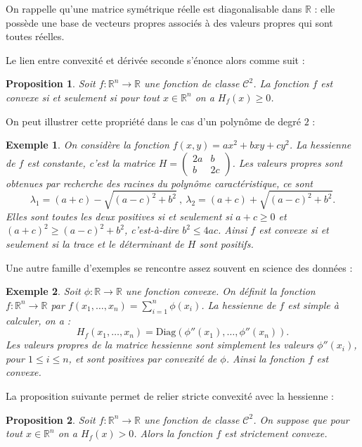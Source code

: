 \documentclass[a4paper]{book}
\newtheorem{proposition}{Proposition}
\newtheorem{exemple}{Exemple}
\newcommand{\Rr}{\mathbb{R}}
\begin{document}
On rappelle qu'une matrice symétrique réelle est diagonalisable dans $\Rr$ : elle possède une base de vecteurs propres associés à des valeurs propres qui sont toutes réelles.

\bigskip

Le lien entre convexité et dérivée seconde s'énonce alors comme suit : 
\begin{proposition}
Soit $f : \Rr^n \to \Rr$ une fonction de classe $\mathcal{C}^2$. La fonction $f$ est convexe si et seulement si pour tout $x \in \Rr^n$ on a $H_f(x) \ge 0$.
\end{proposition}

On peut illustrer cette propriété dans le cas d'un polynôme de degré $2$ : 

\begin{exemple}
On considère la fonction $f(x,y) = a x^2 + b xy + c y^2$. La hessienne de $f$ est constante, c'est la matrice $H = \begin{pmatrix} 2a & b \\ b & 2c \end{pmatrix}$. Les valeurs propres sont obtenues par recherche des racines du polynôme caractéristique, ce sont $$\lambda_1 = (a+c) - \sqrt{(a-c)^2+b^2} \ , \ \lambda_2 = (a+c) + \sqrt{(a-c)^2+b^2}.$$ Elles sont toutes les deux positives si et seulement si $a+c \ge 0$ et $(a+c)^2 \ge (a-c)^2+b^2$, c'est-à-dire $b^2 \le 4 ac$. Ainsi $f$ est convexe si et seulement si la trace et le déterminant de $H$ sont positifs.
\end{exemple}

Une autre famille d'exemples se rencontre assez souvent en science des données : 

\begin{exemple}
Soit $\phi : \Rr \to \Rr$ une fonction convexe. On définit la fonction $f : \Rr^n \to \Rr$ par $f(x_1,\ldots,x_n) = \sum_{i=1}^n \phi(x_i)$. La hessienne de $f$ est simple à calculer, on a : $$H_f(x_1,\ldots,x_n) = \textrm{Diag}(\phi''(x_1),\ldots,\phi''(x_n)).$$ Les valeurs propres de la matrice hessienne sont simplement les valeurs $\phi''(x_i)$, pour $1 \le i \le n$, et sont positives par convexité de $\phi$. Ainsi la fonction $f$ est convexe.
\end{exemple}


La proposition suivante permet de relier stricte convexité avec la hessienne : 
\begin{proposition}
Soit $f : \Rr^n \to \Rr$ une fonction de classe $\mathcal{C}^2$. On suppose que pour tout $x \in \Rr^n$ on a $H_f(x) > 0$. Alors la fonction $f$ est strictement convexe.
\end{proposition}
\end{document}
